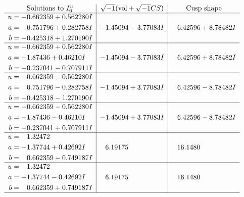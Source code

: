 \documentclass[1p]{elsarticle_modified}
\theoremstyle{definition}
\newcommand{\I}{\sqrt{-1}}
\begin{document}
$$\begin{array}{c|c|c}  
\text{Solutions to }I^u_{6}& \I (\text{vol} + \sqrt{-1}CS) & \text{Cusp shape}\\
 \hline 
\begin{aligned}
u &= -0.662359 + 0.562280 I \\
a &= \phantom{-}0.751796 + 0.282758 I \\
b &= -0.425318 + 1.270190 I\end{aligned}
 & -1.45094 - 3.77083 I & \phantom{-}6.42596 + 8.78482 I \\ \hline\begin{aligned}
u &= -0.662359 + 0.562280 I \\
a &= -1.87436 + 0.46210 I \\
b &= -0.237041 - 0.707911 I\end{aligned}
 & -1.45094 - 3.77083 I & \phantom{-}6.42596 + 8.78482 I \\ \hline\begin{aligned}
u &= -0.662359 - 0.562280 I \\
a &= \phantom{-}0.751796 - 0.282758 I \\
b &= -0.425318 - 1.270190 I\end{aligned}
 & -1.45094 + 3.77083 I & \phantom{-}6.42596 - 8.78482 I \\ \hline\begin{aligned}
u &= -0.662359 - 0.562280 I \\
a &= -1.87436 - 0.46210 I \\
b &= -0.237041 + 0.707911 I\end{aligned}
 & -1.45094 + 3.77083 I & \phantom{-}6.42596 - 8.78482 I \\ \hline\begin{aligned}
u &= \phantom{-}1.32472\phantom{ +0.000000I} \\
a &= -1.37744 + 0.42692 I \\
b &= \phantom{-}0.662359 - 0.749187 I\end{aligned}
 & \phantom{-}6.19175\phantom{ +0.000000I} & \phantom{-}16.1480\phantom{ +0.000000I} \\ \hline\begin{aligned}
u &= \phantom{-}1.32472\phantom{ +0.000000I} \\
a &= -1.37744 - 0.42692 I \\
b &= \phantom{-}0.662359 + 0.749187 I\end{aligned}
 & \phantom{-}6.19175\phantom{ +0.000000I} & \phantom{-}16.1480\phantom{ +0.000000I}\\
 \hline 
 \end{array}$$\newpage\newpage\renewcommand{\arraystretch}{1}
\end{document}
